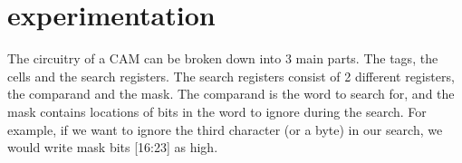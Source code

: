 \section{experimentation}
The circuitry of a CAM can be broken down into 3 main parts. The tags, the cells and the search registers. 
The search registers consist of 2 different registers, the comparand and the mask. 
The comparand is the word to search for, and the mask contains locations of bits in the word to ignore during the search.
For example, if we want to ignore the third character (or a byte) in our search, we would write mask bits [16:23] as high. 
